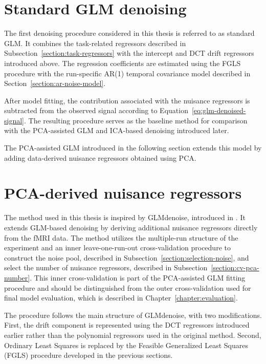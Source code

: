 \documentclass[english]{pwr_wmat_praca_dyplomowa}
\theoremstyle{definition}
\theoremstyle{remark}
\begin{document}
\section{Standard GLM denoising}
\label{section:standard-glm}

The first denoising procedure considered in this thesis is referred to as standard GLM. It combines the task-related regressors described in Subsection~\ref{section:task-regressors} with the intercept and DCT drift regressors introduced above. The regression coefficients are estimated using the FGLS procedure with the run-specific AR(1) temporal covariance model described in Section~\ref{section:ar-noise-model}.

After model fitting, the contribution associated with the nuisance regressors is subtracted from the observed signal according to Equation~\eqref{eq:glm-denoised-signal}. The resulting procedure serves as the baseline method for comparison with the PCA-assisted GLM and ICA-based denoising introduced later.

The PCA-assisted GLM introduced in the following section extends this model by adding data-derived nuisance regressors obtained using PCA.

\section{PCA-derived nuisance regressors}
\label{section:pca-regressors}

The method used in this thesis is inspired by GLMdenoise, introduced in \cite{glm-denoise}. It extends GLM-based denoising by deriving additional nuisance regressors directly from the fMRI data. The method utilizes the multiple-run structure of the experiment and an inner leave-one-run-out cross-validation procedure to construct the noise pool, described in Subsection~\ref{section:selection-noise}, and select the number of nuisance regressors, described in Subsection~\ref{section:cv-pca-number}. This inner cross-validation is part of the PCA-assisted GLM fitting procedure and should be distinguished from the outer cross-validation used for final model evaluation, which is described in Chapter~\ref{chapter:evaluation}.

The procedure follows the main structure of GLMdenoise, with two modifications. First, the drift component is represented using the DCT regressors introduced earlier rather than the polynomial regressors used in the original method. Second, Ordinary Least Squares is replaced by the Feasible Generalized Least Squares (FGLS) procedure developed in the previous sections.
\end{document}
